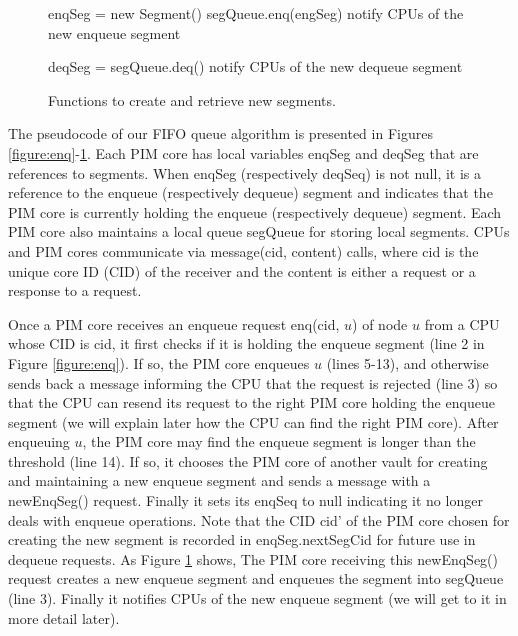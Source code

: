 \documentclass[11pt]{article}
\begin{document}
\begin{figure}
\begin{algorithm}[H]
\Begin
{
    enqSeg = new Segment() \;
    segQueue.enq(engSeg) \;
    notify CPUs of the new enqueue segment\;
}
\end{algorithm}

\begin{algorithm}[H]
\Begin
{
    deqSeg = segQueue.deq() \;
    notify CPUs of the new dequeue segment\;
}
\end{algorithm}	
\caption{Functions to create and retrieve new segments.}
\label{figure:newSegment}
\end{figure}

The pseudocode of our FIFO queue algorithm is presented in 
Figures \ref{figure:enq}-\ref{figure:newSegment}. 
Each PIM core has local variables enqSeg and deqSeg that are references to segments.
When enqSeg (respectively deqSeq) is not null, it is a reference to the enqueue 
(respectively dequeue) segment and indicates that the PIM core is currently holding 
the enqueue (respectively dequeue) segment.
Each PIM core also maintains a local queue segQueue for storing local segments.
CPUs and PIM cores communicate via message(cid, content) calls, where cid is the unique core ID (CID) 
of the receiver and the content is either a request or a response to a request.

Once a PIM core receives an enqueue request enq(cid, $u$) of node $u$ from a CPU whose CID is cid,
it first checks if it is holding the enqueue segment (line 2 in Figure \ref{figure:enq}).
If so, the PIM core enqueues $u$ (lines 5-13), and otherwise sends back a message
informing the CPU that the request is rejected (line 3) so that
the CPU can resend its request to the right PIM core holding the enqueue segment
(we will explain later how the CPU can find the right PIM core).
After enqueuing $u$, the PIM core may find the enqueue segment is longer than the threshold (line 14).
If so, it chooses the PIM core of another vault for creating and maintaining a new enqueue segment 
and sends a message with a newEnqSeg() request.
Finally it sets its enqSeq to null indicating it no longer deals with enqueue operations.
Note that the CID cid' of the PIM core chosen for creating the new segment is recorded in 
enqSeg.nextSegCid for future use in dequeue requests.
As Figure \ref{figure:newSegment} shows,
The PIM core receiving this newEnqSeg() request creates a new enqueue segment and enqueues 
the segment into segQueue (line 3). 
Finally it notifies CPUs of the new enqueue segment (we will get to it in more detail later).
\end{document}
